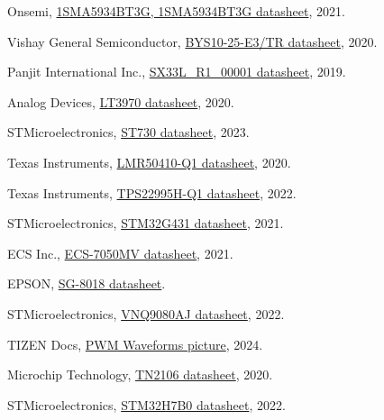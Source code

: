 \documentclass[10pt]{datasheet}
\begin{document}
\newpage
\begin{thebibliography}{9}
Onsemi, \href{https://www.onsemi.com/pdf/datasheet/1sma5913bt3-d.pdf}{1SMA5934BT3G, 1SMA5934BT3G datasheet}, 2021.

Vishay General Semiconductor, \href{https://www.vishay.com/docs/86013/bys10.pdf}{BYS10-25-E3/TR datasheet}, 2020.

Panjit International Inc., \href{https://www.panjit.com.tw/upload/datasheet/SX33L.pdf}{SX33L\_R1\_00001 datasheet}, 2019.

Analog Devices, \href{https://www.analog.com/media/en/technical-documentation/data-sheets/lt3970.pdf}{LT3970 datasheet}, 2020.

STMicroelectronics, \href{https://www.st.com/resource/en/datasheet/st730.pdf}{ST730 datasheet}, 2023.

Texas Instruments, \href{https://www.ti.com/lit/ds/symlink/lmr50410-q1.pdf?ts=1719910719230&ref_url=https%253A%252F%252F}{LMR50410-Q1 datasheet}, 2020.

Texas Instruments, \href{https://www.ti.com/lit/ds/symlink/tps22995h-q1.pdf}{TPS22995H-Q1 datasheet}, 2022.

STMicroelectronics, \href{https://www.st.com/resource/en/datasheet/stm32g431cb.pdf}{STM32G431 datasheet}, 2021.

ECS Inc., \href{https://www.ecsxtal.com/store/pdf/ECS-7050MV.pdf}{ECS-7050MV datasheet}, 2021.

EPSON, \href{https://support.epson.biz/td/api/doc_check.php?dl=brief_SG-8018CE&lang=en}{SG-8018 datasheet}.

STMicroelectronics, \href{https://www.st.com/resource/en/datasheet/vnq9080aj.pdf}{VNQ9080AJ datasheet}, 2022.

TIZEN Docs, \href{https://docs.tizen.org/iot/guides/media/peri_api_duty_cycle_voltage.png}{PWM Waveforms picture}, 2024.

Microchip Technology, \href{https://ww1.microchip.com/downloads/en/DeviceDoc/TN2106-N-Channel-Enhancement-Mode-Vertical-DMOS-FET-Data-Sheet-20005942A.pdf}{TN2106 datasheet}, 2020.

STMicroelectronics, \href{https://www.st.com/resource/en/datasheet/stm32h7b0rb.pdf}{STM32H7B0 datasheet}, 2022.


\end{thebibliography}
\end{document}
